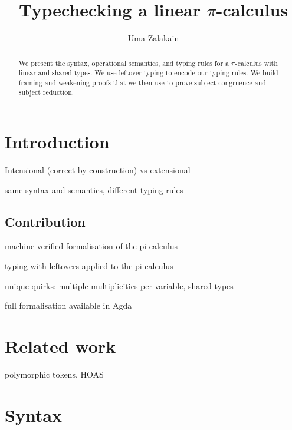 \documentclass{scrartcl}
\newcommand{\picalc}{$\pi$-calculus}
\begin{document}
\title{Typechecking a linear \picalc}
\author{Uma Zalakain}
\maketitle

\begin{abstract}
  We present the syntax, operational semantics, and typing rules for a \picalc{} with linear and shared types. We use leftover typing \cite{} to encode our typing rules. We build framing and weakening proofs that we then use to prove subject congruence and subject reduction.
\end{abstract}

\section{Introduction}

Intensional (correct by construction) vs extensional

same syntax and semantics, different typing rules

\subsection{Contribution}

machine verified formalisation of the pi calculus

typing with leftovers applied to the pi calculus

unique quirks: multiple multiplicities per variable, shared types

full formalisation available in Agda

\section{Related work}

\cite{previous-work} polymorphic tokens, HOAS

\cite{typing-with-leftovers}

\section{Syntax}
\end{document}
